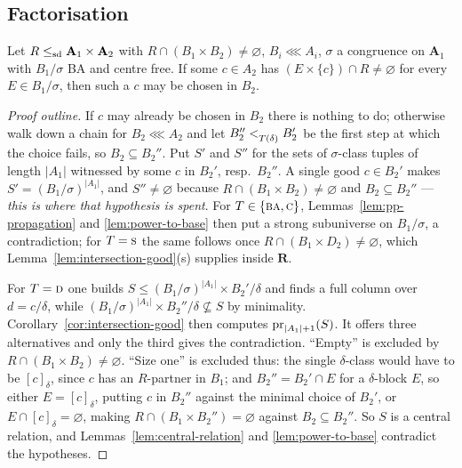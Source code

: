 \subsection{Factorisation}\label{sec:factorisation}

\begin{lemma}\label{lem:center-pushed-in}
Let $R\le_{\mathrm{sd}}\mathbf A_{1}\times\mathbf A_{2}$ with
$R\cap(B_{1}\times B_{2})\neq\varnothing$, $B_{i}\lll A_{i}$, $\sigma$ a
congruence on $\mathbf A_{1}$ with $B_{1}/\sigma$ BA and centre free. If some
$c\in A_{2}$ has $(E\times\{c\})\cap R\neq\varnothing$ for every $E\in
B_{1}/\sigma$, then such a $c$ may be chosen in $B_{2}$.
\end{lemma}

\begin{proof}[Proof outline]
If $c$ may already be chosen in $B_{2}$ there is nothing to do; otherwise walk
down a chain for $B_{2}\lll A_{2}$ and let $B_{2}''<_{T(\delta)}^{}B_{2}'$ be
the first step at which the choice fails, so $B_{2}\subseteq B_{2}''$. Put
$S'$ and $S''$ for the sets of $\sigma$-class tuples of length $|A_{1}|$
witnessed by some $c$ in $B_{2}'$, resp.\ $B_{2}''$. A single good $c\in B_{2}'$
makes $S'=(B_{1}/\sigma)^{|A_{1}|}$, and $S''\neq\varnothing$ because
$R\cap(B_{1}\times B_{2})\neq\varnothing$ and $B_{2}\subseteq B_{2}''$ ---
\emph{this is where that hypothesis is spent}. For $T\in\{\textup{\textsc{ba}},\textup{\textsc{c}}\}$,
Lemmas~\ref{lem:pp-propagation} and \ref{lem:power-to-base} then put a strong
subuniverse on $B_{1}/\sigma$, a contradiction; for $T=\textup{\textsc{s}}$ the same follows
once $R\cap(B_{1}\times D_{2})\neq\varnothing$, which
Lemma~\ref{lem:intersection-good}(s) supplies inside $\mathbf R$.

For $T=\textup{\textsc{d}}$ one builds
$S\le(B_{1}/\sigma)^{|A_{1}|}\times B_{2}'/\delta$ and finds a full column over
$d=c/\delta$, while $(B_{1}/\sigma)^{|A_{1}|}\times B_{2}''/\delta\not\subseteq
S$ by minimality. Corollary~\ref{cor:intersection-good} then computes
$\operatorname*{pr}_{|A_{1}|+1}(S)$. It offers three alternatives and only the third gives
the contradiction. ``Empty'' is excluded by
$R\cap(B_{1}\times B_{2})\neq\varnothing$. ``Size one'' is excluded thus: the
single $\delta$-class would have to be $[c]_{\delta}$, since $c$ has an
$R$-partner in $B_{1}$; and $B_{2}''=B_{2}'\cap E$ for a $\delta$-block $E$, so
either $E=[c]_{\delta}$, putting $c$ in $B_{2}''$ against the minimal choice of
$B_{2}'$, or $E\cap[c]_{\delta}=\varnothing$, making
$R\cap(B_{1}\times B_{2}'')=\varnothing$ against $B_{2}\subseteq B_{2}''$. So
$S$ is a central relation, and Lemmas~\ref{lem:central-relation} and
\ref{lem:power-to-base} contradict the hypotheses.
\end{proof}

